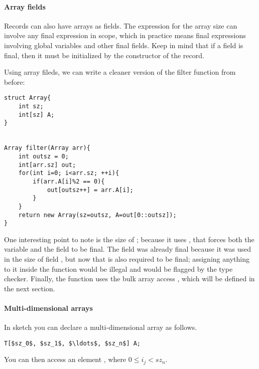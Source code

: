 \paragraph{Array fields}
Records can also have arrays as fields. The expression for the array size can involve any final expression in scope, which in practice means final expressions involving global variables and other final fields. Keep in mind that if a field is final, then it must be initialized by the constructor of the record.

\begin{Example}
Using array fileds, we can write a cleaner version of the filter function from before:
\begin{lstlisting}
struct Array{
	int sz;
	int[sz] A;
}


Array filter(Array arr){
	int outsz = 0;
	int[arr.sz] out;
	for(int i=0; i<arr.sz; ++i){
		if(arr.A[i]%2 == 0){
			out[outsz++] = arr.A[i];
		}
	}
	return new Array(sz=outsz, A=out[0::outsz]);
}
\end{lstlisting}
One interesting point to note is the size of ; because it uses , that forces both the variable  and the field  to be final. The field  was already final because it was used in the size of field , but now that  is also required to be final; assigning anything to it inside the function would be illegal and would be flagged by the type checker. Finally, the function uses the bulk array access , which will be defined in the next section.
\end{Example}






\paragraph{Multi-dimensional arrays}
In sketch you can declare a multi-dimensional array as follows.
\begin{lstlisting}
T[$sz_0$, $sz_1$, $\ldots$, $sz_n$] A;
\end{lstlisting}
You can then access an element , where $0\leq i_j < sz_n$.

